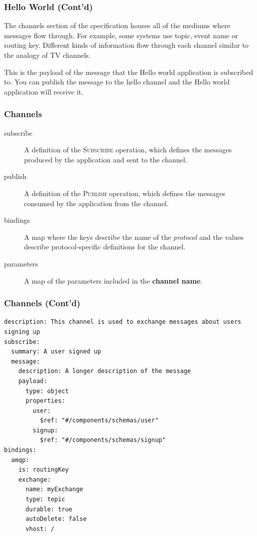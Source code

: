 \documentclass{efd-lecture}
\begin{document}
\begin{frame}[fragile]
  \frametitle{Hello World (Cont'd)}
  \begin{block}{}
    The channels section of the specification houses all of the mediums where messages flow through. For example,
    some systems use topic, event name or routing key.
    Different kinds of information flow through each channel similar to the analogy of TV channels.
  \end{block}
\end{frame}

\begin{frame}
  \begin{block}{}
    This is the payload of the message that the Hello world application is subscribed to.
    You can publish the message to the hello channel and the Hello world application will receive it.
  \end{block}
\end{frame}

\begin{frame}
  \frametitle{Channels}
  \begin{description}
    \item[subscribe] A definition of the \textsc{\color{YellowOrange}Subscribe} operation, which defines the messages produced by the application and sent to the channel.
    \item[publish] A definition of the \textsc{\color{LimeGreen}Publish} operation, which defines the messages consumed by the application from the channel.
    \item[bindings] A map where the keys describe the name of the \textit{\color{Cyan}protocol} and the values describe protocol-specific definitions for the channel.
    \item[parameters] A map of the parameters included in the \textbf{\color{Purple} channel name}.
  \end{description}
\end{frame}

\begin{frame}[fragile]
  \frametitle{Channels (Cont'd)}
  \scriptsize
  \begin{verbatim}
description: This channel is used to exchange messages about users signing up
subscribe:
  summary: A user signed up
  message:
    description: A longer description of the message
    payload:
      type: object
      properties:
        user:
          $ref: "#/components/schemas/user"
        signup:
          $ref: "#/components/schemas/signup"
bindings:
  amqp:
    is: routingKey
    exchange:
      name: myExchange
      type: topic
      durable: true
      autoDelete: false
      vhost: /
  \end{verbatim}
\end{frame}
\end{document}
